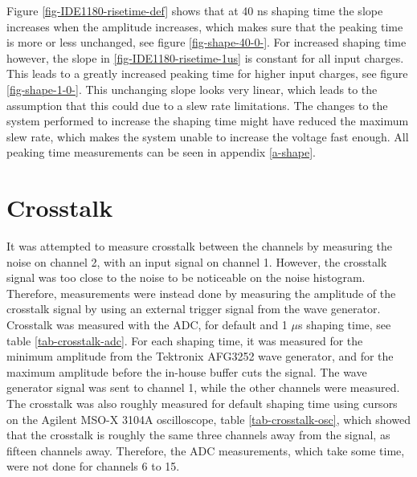 \documentclass[../main/thesis.tex]{subfiles}
\begin{document}
Figure \ref{fig-IDE1180-risetime-def} shows that at 40 ns shaping time the slope increases when the amplitude increases, which makes sure that the peaking time is more or less unchanged, see figure \ref{fig-shape-40-0-}. For increased shaping time however, the slope in \ref{fig-IDE1180-risetime-1us} is constant for all input charges. This leads to a greatly increased peaking time for higher input charges, see figure \ref{fig-shape-1-0-}. This unchanging slope looks very linear, which leads to the assumption that this could due to a slew rate limitations. The changes to the system performed to increase the shaping time might have reduced the maximum slew rate, which makes the system unable to increase the voltage fast enough. All peaking time measurements can be seen in appendix \ref{a-shape}.


\section{Crosstalk}
\label{ide-crosstalk}

It was attempted to measure crosstalk between the channels by measuring the noise on channel 2, with an input signal on channel 1. However, the crosstalk signal was too close to the noise to be noticeable on the noise histogram. Therefore, measurements were instead done by measuring the amplitude of the crosstalk signal by using an external trigger signal from the wave generator. Crosstalk was measured with the ADC, for default and 1 $\mu$s shaping time, see table \ref{tab-crosstalk-adc}. For each shaping time, it was measured for the minimum amplitude from the Tektronix AFG3252 wave generator, and for the maximum amplitude before the in-house buffer cuts the signal. The wave generator signal was sent to channel 1, while the other channels were measured. The crosstalk was also roughly measured for default shaping time using cursors on the Agilent MSO-X 3104A oscilloscope, table \ref{tab-crosstalk-osc}, which showed that the crosstalk is roughly the same three channels away from the signal, as fifteen channels away. Therefore, the ADC measurements, which take some time, were not done for channels 6 to 15. 
\end{document}
